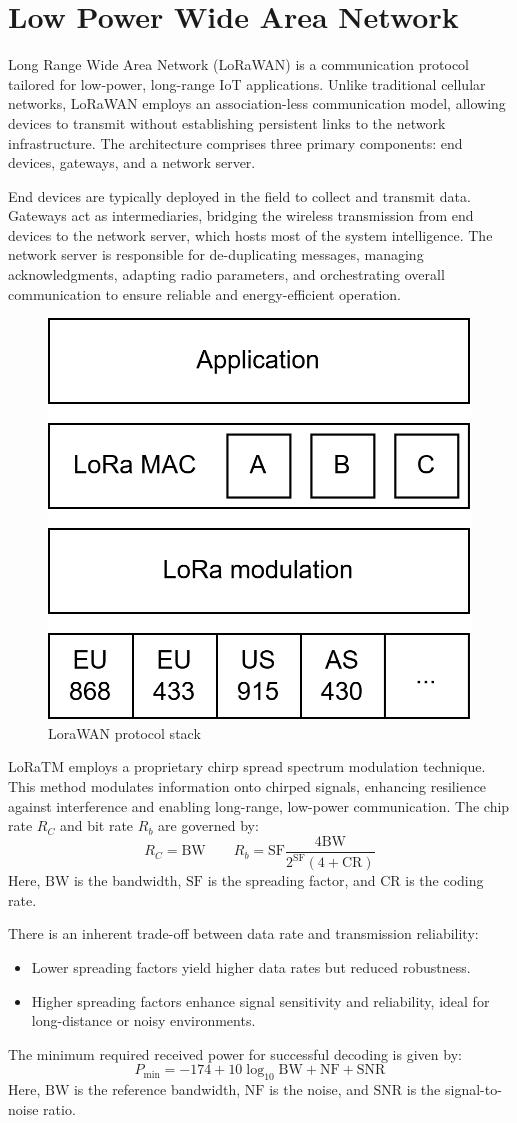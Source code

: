 \section{Low Power Wide Area Network}

Long Range Wide Area Network (LoRaWAN)  is a communication protocol tailored for low-power, long-range IoT applications.
Unlike traditional cellular networks, LoRaWAN employs an association-less communication model, allowing devices to transmit without establishing persistent links to the network infrastructure. 
The architecture comprises three primary components: end devices, gateways, and a network server.

End devices are typically deployed in the field to collect and transmit data. 
Gateways act as intermediaries, bridging the wireless transmission from end devices to the network server, which hosts most of the system intelligence. 
The network server is responsible for de-duplicating messages, managing acknowledgments, adapting radio parameters, and orchestrating overall communication to ensure reliable and energy-efficient operation.

\begin{figure}[H]
    \centering
    \includegraphics[width=0.4\linewidth]{images/iot11.png}
    \caption{LoraWAN protocol stack}
\end{figure}

LoRaTM employs a proprietary chirp spread spectrum modulation technique. 
This method modulates information onto chirped signals, enhancing resilience against interference and enabling long-range, low-power communication. 
The chip rate $R_C$ and bit rate $R_b$ are governed by:
\[R_C=\text{BW}\qquad R_b=\text{SF}\dfrac{4\text{BW}}{2^{\text{SF}}(4+\text{CR})}\]
Here, $\text{BW}$ is the bandwidth, $\text{SF}$ is the spreading factor, and $\text{CR}$ is the coding rate. 

There is an inherent trade-off between data rate and transmission reliability:
\begin{itemize}
    \item Lower spreading factors yield higher data rates but reduced robustness.
    \item Higher spreading factors enhance signal sensitivity and reliability, ideal for long-distance or noisy environments.
\end{itemize}
\noindent The minimum required received power for successful decoding is given by:
\[P_{\min}=-174+10\log_{10}\text{BW}+\text{NF}+\text{SNR}\]
\noindent Here, $\text{BW}$ is the reference bandwidth, $\text{NF}$ is the noise, and $\text{SNR}$ is the signal-to-noise ratio. 


